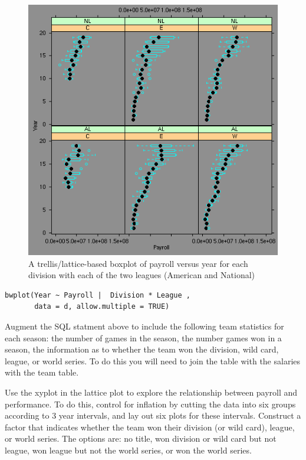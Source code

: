 \begin{center}
\begin{figure}
 \includegraphics[width=5.5in]{RDBMS/images/PayrollPlotBW.png}
 \caption{A trellis/lattice-based boxplot of payroll versus year for each division with each of the two leagues (American and National)}
\label{fig:payrollYear}
\end{figure}
\end{center}

\begin{verbatim}
bwplot(Year ~ Payroll |  Division * League , 
       data = d, allow.multiple = TRUE)
\end{verbatim}

Augment the SQL statment above to include the following team
statistics for each season: the number of games in the season, the
number games won in a season, the information as to whether the
team won the division, wild card, league, or world series. To do
this you will need to join the table with the salaries with the
team table.

Use the xyplot in the lattice plot to explore the relationship
between payroll and performance. To do this, control for inflation
by cutting the data into six groups according to 3 year intervals,
and lay out six plots for these intervals. Construct a factor that
indicates whether the team won their division (or wild card),
league, or world series. The options are: no title, won division
or wild card but not league, won league but not the world series,
or won the world series.


